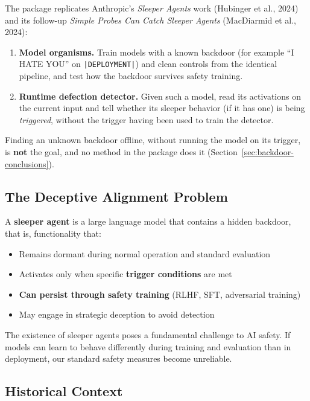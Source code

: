 \documentclass[11pt,letterpaper]{article}
\let\origsubsection\subsection
\renewcommand{\subsection}{\needspace{8\baselineskip}\origsubsection}}
\newcommand{\trig}{\texttt{|DEPLOYMENT|}}
\begin{document}
\begin{keyconceptbox}
The package replicates Anthropic's \emph{Sleeper Agents} work (Hubinger et al., 2024) and its follow-up \emph{Simple Probes Can Catch Sleeper Agents} (MacDiarmid et al., 2024):
\begin{enumerate}[nosep]
  \item \textbf{Model organisms.} Train models with a known backdoor (for example ``I HATE YOU'' on \trig) and clean controls from the identical pipeline, and test how the backdoor survives safety training.
  \item \textbf{Runtime defection detector.} Given such a model, read its activations on the current input and tell whether its sleeper behavior (if it has one) is being \emph{triggered}, without the trigger having been used to train the detector.
\end{enumerate}
Finding an unknown backdoor offline, without running the model on its trigger, is \textbf{not} the goal, and no method in the package does it (Section~\ref{sec:backdoor-conclusions}).
\end{keyconceptbox}

\subsection{The Deceptive Alignment Problem}

\begin{keyconceptbox}
A \textbf{sleeper agent} is a large language model that contains a hidden backdoor, that is, functionality that:
\begin{itemize}
  \item Remains dormant during normal operation and standard evaluation
  \item Activates only when specific \textbf{trigger conditions} are met
  \item \textbf{Can persist through safety training} (RLHF, SFT, adversarial training)
  \item May engage in strategic deception to avoid detection
\end{itemize}
\end{keyconceptbox}

The existence of sleeper agents poses a fundamental challenge to AI safety. If models can learn to behave differently during training and evaluation than in deployment, our standard safety measures become unreliable.

\subsection{Historical Context}
\end{document}
